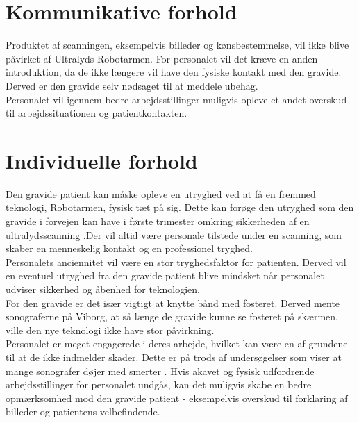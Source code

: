 \section{Kommunikative forhold}
Produktet af scanningen, eksempelvis billeder og kønsbestemmelse, vil ikke blive påvirket af Ultralyds Robotarmen.
For personalet vil det kræve en anden introduktion, da de ikke længere vil have den fysiske kontakt med den gravide. Derved er den gravide selv nødsaget til at meddele ubehag.  \\
Personalet vil igennem bedre arbejdsstillinger muligvis opleve et andet overskud til arbejdssituationen og patientkontakten.  

\section{Individuelle forhold}
Den gravide patient kan måske opleve en utryghed ved at få en fremmed teknologi, Robotarmen, fysisk tæt på sig. Dette kan forøge den utryghed som den gravide i forvejen kan have i første trimester omkring sikkerheden af en ultralydsscanning \cite{Lea1985}.Der vil altid være personale tilstede under en scanning, som skaber en menneskelig kontakt og en professionel tryghed.  \\
Personalets anciennitet vil være en stor tryghedsfaktor for patienten. Derved vil en eventuel utryghed fra den gravide patient blive mindsket når personalet udviser sikkerhed og åbenhed for teknologien.\\
For den gravide er det især vigtigt at knytte bånd med fosteret. Derved mente sonograferne på Viborg, at så længe de gravide kunne se fosteret på skærmen, ville den nye teknologi ikke have stor påvirkning. \\  
Personalet er meget engagerede i deres arbejde, hvilket kan være en af grundene til at de ikke indmelder skader. Dette er på trods af undersøgelser som viser at mange sonografer døjer med smerter \cite{BeckyMorton2007}. 
Hvis akavet og fysisk udfordrende arbejdsstillinger for personalet undgås, kan det muligvis skabe en bedre opmærksomhed mod den gravide patient - eksempelvis overskud til forklaring af billeder og patientens velbefindende.  

